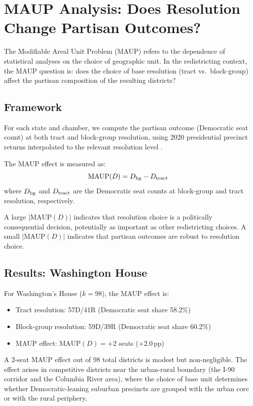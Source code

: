 \section{MAUP Analysis: Does Resolution Change Partisan Outcomes?}
\label{sec:maup}

The Modifiable Areal Unit Problem (MAUP) \citep{openshaw1984modifiable} refers
to the dependence of statistical analyses on the choice of geographic unit.
In the redistricting context, the MAUP question is: does the choice of base
resolution (tract vs.\ block-group) affect the partisan composition of the
resulting districts?

\subsection{Framework}
\label{sec:maup:framework}

For each state and chamber, we compute the partisan outcome (Democratic seat count)
at both tract and block-group resolution, using 2020 presidential precinct returns
interpolated to the relevant resolution level \citep{Kuriwaki2023}.

The MAUP effect is measured as:
\[
  \text{MAUP}(D) = D_{\rm bg} - D_{\rm tract}
\]
where $D_{\rm bg}$ and $D_{\rm tract}$ are the Democratic seat counts at
block-group and tract resolution, respectively.

A large $|\text{MAUP}(D)|$ indicates that resolution choice is a politically
consequential decision, potentially as important as other redistricting choices.
A small $|\text{MAUP}(D)|$ indicates that partisan outcomes are robust to
resolution choice.

\subsection{Results: Washington House}
\label{sec:maup:wa}

For Washington's House ($k=98$), the MAUP effect is:
\begin{itemize}
  \item Tract resolution: 57D/41R (Democratic seat share 58.2\%)
  \item Block-group resolution: 59D/39R (Democratic seat share 60.2\%)
  \item MAUP effect: $\text{MAUP}(D) = +2$ seats ($+2.0$\,pp)
\end{itemize}

A 2-seat MAUP effect out of 98 total districts is modest but non-negligible.
The effect arises in competitive districts near the urban-rural boundary
(the I-90 corridor and the Columbia River area), where the choice of base
unit determines whether Democratic-leaning suburban precincts are grouped
with the urban core or with the rural periphery.

